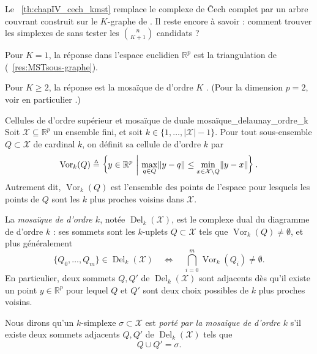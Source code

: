 Le \Th~\ref{th:chapIV_cech_kmst} remplace le complexe de \v Cech complet par un arbre couvrant construit sur le $K$-graphe de . Il reste encore à savoir : comment trouver les simplexes de  sans tester les $\binom n{K+1}$ candidats ?

Pour $K=1$, la réponse dans l'espace euclidien $\mathbb R^p$ est la triangulation de  (\Res~\ref{res:MSTsous-graphe}). 

Pour $K\ge2$, la réponse est la mosaïque de  d'ordre $K$ \cite{edelsbrunnerOsang2021multicover, osangEdelsbrunner2023algorithm}.
(Pour la dimension $p=2$, voir en particulier \cite{MitscheSaumellSilveira2011HigherOrderDelaunay}.)



\begin{Definition}{Cellules de  d'ordre supérieur et mosaïque de  duale \cite{edelsbrunnerOsang2021multicover, osangEdelsbrunner2023algorithm}}{mosaïque_delaunay_ordre_k}
Soit $\mathcal X \subseteq \mathbb R^p$ un ensemble fini, et soit $k \in \{1,\ldots,|\mathcal X|-1\}$.
Pour tout sous-ensemble $Q \subset \mathcal X$ de cardinal $k$, on définit sa cellule de  d'ordre $k$ par
\[
    \operatorname{Vor}_k(Q)
    \triangleq
    \left\{
        y \in \mathbb R^p
        \ \middle|\
        \max_{q\in Q} \lVert y-q \rVert
        \le
        \min_{x\in \mathcal X\setminus Q} \lVert y-x \rVert
    \right\}.
\]
Autrement dit, $\operatorname{Vor}_k(Q)$ est l'ensemble des points de l'espace pour lesquels les points de $Q$ sont les $k$ plus proches voisins dans $\mathcal X$.

La \emph{mosaïque de  d'ordre $k$}, notée $\operatorname{Del}_k(\mathcal X)$, est le complexe dual du diagramme de  d'ordre $k$ : ses sommets sont les $k$-uplets $Q \subset \mathcal X$ tels que $\operatorname{Vor}_k(Q)\neq\emptyset$, et plus généralement
\[
    \{Q_0,\ldots,Q_m\} \in \operatorname{Del}_k(\mathcal X)
    \quad\Longleftrightarrow\quad
    \bigcap_{i=0}^m \operatorname{Vor}_k(Q_i) \neq \emptyset.
\]
En particulier, deux sommets $Q,Q'$ de $\operatorname{Del}_k(\mathcal X)$ sont adjacents dès qu'il existe un point $y\in\mathbb R^p$ pour lequel $Q$ et $Q'$ sont deux choix possibles de $k$ plus proches voisins.

Nous dirons qu'un $k$-simplexe $\sigma\subset\mathcal X$ est \emph{porté par la mosaïque de  d'ordre $k$} s'il existe deux sommets adjacents $Q,Q'$ de $\operatorname{Del}_k(\mathcal X)$ tels que
\[
    Q\cup Q'=\sigma.
\]
\end{Definition}

